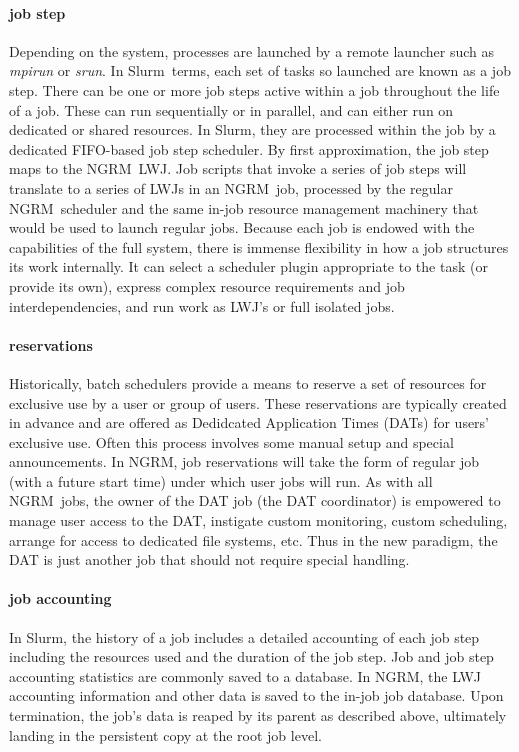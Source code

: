 \documentclass[10pt]{article}
\newcommand{\ngrm}{NGRM}
\newcommand{\slurm}{Slurm}
\begin{document}
\paragraph{job step}
Depending on the system, processes are launched by a remote launcher such
as {\em mpirun} or {\em srun}.  In \slurm\ terms, each set of tasks so launched are
known as a job step.  There can be one or more job steps active within
a job throughout the life of a job.  These can run sequentially or in
parallel, and can either run on dedicated or shared resources.
In \slurm, they are processed within the job by a dedicated FIFO-based
job step scheduler.
By first approximation, the job step maps to the \ngrm\ LWJ. 
Job scripts that invoke a series of job steps will translate
to a series of LWJs in an \ngrm\ job, processed by the regular \ngrm\ scheduler
and the same in-job resource management machinery that would be used to
launch regular jobs.  Because each job is endowed with the capabilities
of the full system, there is immense flexibility in how a job structures
its work internally.  It can select a scheduler plugin appropriate to the
task (or provide its own), express complex resource requirements and job
interdependencies, and run work as LWJ's or full isolated jobs.

\paragraph{reservations}
Historically, batch schedulers provide a means to reserve a set of
resources for exclusive use by a user or group of users.  These
reservations are typically created in advance and are offered as
Dedidcated Application Times (DATs) for users' exclusive use.
Often this process involves some manual setup and special announcements.
In \ngrm, job reservations will take the form of regular job (with a
future start time) under which user jobs will run.  As with all \ngrm\ jobs,
the owner of the DAT job (the DAT coordinator) is empowered to manage
user access to the DAT, instigate custom monitoring, custom scheduling, 
arrange for access to dedicated file systems, etc.
Thus in the new paradigm, the DAT is just another job that should not require
special handling.

\paragraph{job accounting}
In \slurm, the history of a job includes a detailed accounting of each job step
including the resources used and the duration of the job step.
Job and job step accounting statistics are commonly saved to a database.
In \ngrm, the LWJ accounting information and other data is saved to the
in-job job database.  Upon termination, the job's data is reaped by its
parent as described above, ultimately landing in the persistent copy
at the root job level.
\end{document}
